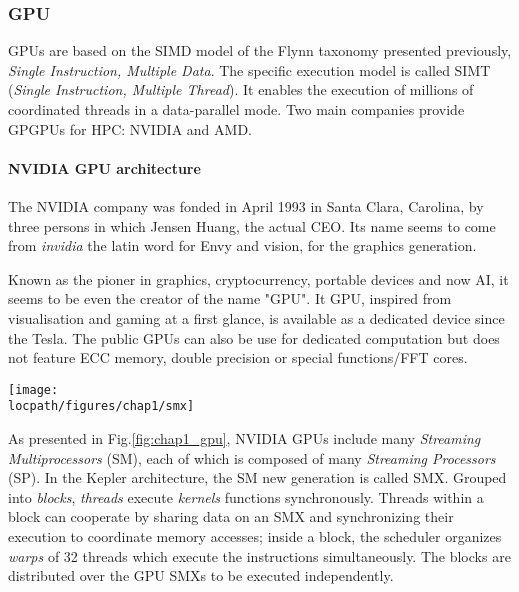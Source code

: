 \subsubsection{GPU}

GPUs are based on the SIMD model of the Flynn taxonomy presented previously, \emph{Single Instruction, Multiple Data}.
The specific execution model is called SIMT (\emph{Single Instruction, Multiple Thread}). It enables the execution of millions of coordinated threads in a data-parallel mode. 
Two main companies provide GPGPUs for  HPC: NVIDIA and AMD.

\paragraph{NVIDIA GPU architecture}

The NVIDIA company was fonded in April 1993 in Santa Clara, Carolina, by three persons in which Jensen Huang, the actual CEO.
Its name seems to come from \textit{invidia} the latin word for Envy and vision, for the graphics generation. 

Known as the pioner in graphics, cryptocurrency, portable devices and now AI, it seems to be even the creator of the name "GPU".
It GPU, inspired from visualisation and gaming at a first glance, is available as a dedicated device  since the Tesla. 
The public GPUs can also be use for dedicated computation but does not feature ECC memory, double precision or special functions/FFT cores. 

\begin{figure*}[t!]
\centering
\setlength\fboxsep{0pt}
\setlength\fboxrule{0.25pt}
\texttt{[image: \\locpath/figures/chap1/smx]}
\caption{NVIDIA GPU and CUDA architecture overview}
 \label{fig:chap1_gpu}
\end{figure*}

As presented in Fig.\ref{fig:chap1_gpu}, NVIDIA GPUs include many \emph{Streaming Multiprocessors} (SM), each of which is composed of many \emph{Streaming Processors} (SP). In the Kepler architecture, the SM new generation is called SMX.
%
Grouped into \emph{blocks}, \textit{threads} execute \emph{kernels} functions synchronously.
Threads within a block can cooperate by sharing data on an SMX and synchronizing their execution to coordinate memory accesses; inside a block, the scheduler organizes \emph{warps} of 32 threads which execute the instructions simultaneously.
The blocks are distributed over the GPU SMXs to be executed independently.

